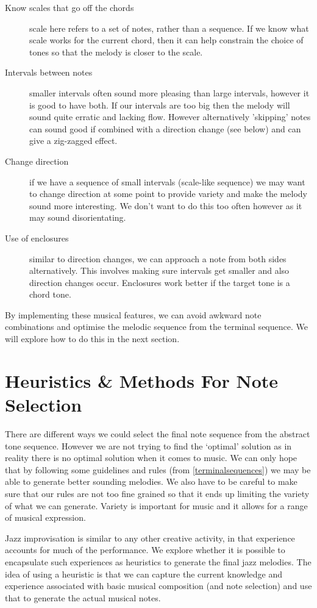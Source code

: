 \documentclass[pdftex,12pt,a4paper]{report}
\begin{document}
\begin{description}
  \item[Know scales that go off the chords] scale here refers to a set of notes, rather than a sequence. If we know what scale works for the current chord, then it can help constrain the choice of tones so that the melody is closer to the scale.
  \item[Intervals between notes] smaller intervals often sound more pleasing than large intervals, however it is good to have both. If our intervals are too big then the melody will sound quite erratic and lacking flow. However alternatively 'skipping' notes can sound good if combined with a direction change (see below) and can give a zig-zagged effect.
  \item[Change direction] if we have a sequence of small intervals (scale-like sequence) we may want to change direction at some point to provide variety and make the melody sound more interesting. We don't want to do this too often however as it may sound disorientating.
  \item[Use of enclosures] similar to direction changes, we can approach a note from both sides alternatively. This involves making sure intervals get smaller and also direction changes occur. Enclosures work better if the target tone is a chord tone.
\end{description}

By implementing these musical features, we can avoid awkward note combinations and optimise the melodic sequence from the terminal sequence. We will explore how to do this in the next section.


\section{Heuristics \& Methods For Note Selection}
There are different ways we could select the final note sequence from the abstract tone sequence. However we are not trying to find the `optimal' solution as in reality there is no optimal solution when it comes to music. We can only hope that by following some guidelines and rules (from \ref{terminalsequences}) we may be able to generate better sounding melodies. We also have to be careful to make sure that our rules are not too fine grained so that it ends up limiting the variety of what we can generate. Variety is important for music and it allows for a range of musical expression.

Jazz improvisation is similar to any other creative activity, in that experience accounts for much of the performance. We explore whether it is possible to encapsulate such experiences as heuristics to generate the final jazz melodies. The idea of using a heuristic is that we can capture the current knowledge and experience associated with basic musical composition (and note selection) and use that to generate the actual musical notes. 
\end{document}
